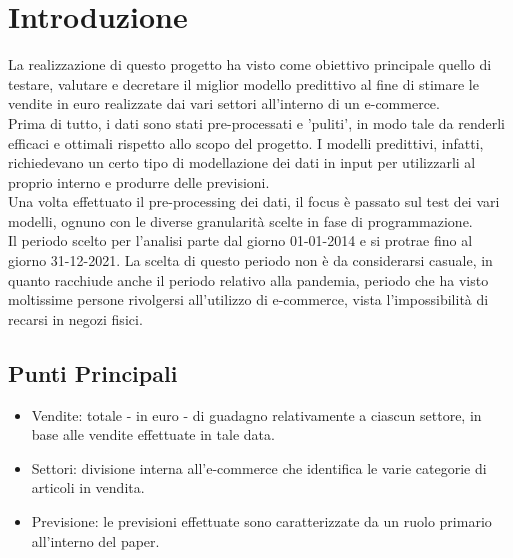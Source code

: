 \documentclass[12pt, a4paper, twocolumn]{article} %
\begin{document}
\clearpage
\bigskip
\tableofcontents


\section{Introduzione}
La realizzazione di questo progetto ha visto come obiettivo principale quello di testare, valutare e decretare il miglior modello predittivo al fine di stimare le vendite in euro realizzate dai vari settori all'interno di un e-commerce.\\
Prima di tutto, i dati sono stati pre-processati e 'puliti', in modo tale da renderli efficaci e ottimali rispetto allo scopo del progetto. I modelli predittivi, infatti, richiedevano un certo tipo di modellazione dei dati in input per utilizzarli al proprio interno e produrre delle previsioni.\\
Una volta effettuato il pre-processing dei dati, il focus è passato sul test dei vari modelli, ognuno con le diverse granularità scelte in fase di programmazione.\\
Il periodo scelto per l'analisi parte dal giorno 01-01-2014 e si protrae fino al giorno 31-12-2021. La scelta di questo periodo non è da considerarsi casuale, in quanto racchiude anche il periodo relativo alla pandemia, periodo che ha visto moltissime persone rivolgersi all'utilizzo di e-commerce, vista l'impossibilità di recarsi in negozi fisici.

\subsection{Punti Principali}
\begin{itemize}
	\item Vendite: totale - in euro - di guadagno relativamente a ciascun settore, in base alle vendite effettuate in tale data.
	\item Settori: divisione interna all'e-commerce che identifica le varie categorie di articoli in vendita.
	\item Previsione: le previsioni effettuate sono caratterizzate da un ruolo primario all'interno del paper.
\end{itemize}
\end{document}
